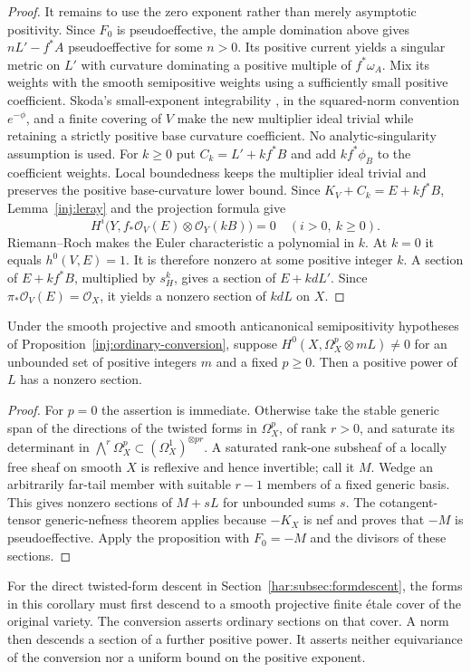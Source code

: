 \begin{proof}
It remains to use the zero exponent rather than merely asymptotic
positivity.  Since $F_0$ is pseudoeffective, the ample domination above
gives $nL'-f^*A$ pseudoeffective for some $n>0$.  Its positive current
yields a singular metric on $L'$ with curvature dominating a positive
multiple of $f^*\omega_A$.  Mix its weights with the smooth semipositive
weights using a sufficiently small positive coefficient.  Skoda's
small-exponent integrability \cite[Lemma~5.6(a)]{Demailly2011}, in
the squared-norm convention $e^{-\phi}$, and a finite covering of $V$ make the
new multiplier ideal trivial while retaining a strictly positive base
curvature coefficient.  No analytic-singularity assumption is used.
For $k\ge0$ put $C_k=L'+kf^*B$ and add $kf^*\phi_B$ to the coefficient
weights. Local boundedness keeps the multiplier ideal trivial and
preserves the positive base-curvature lower bound. Since
$K_V+C_k=E+kf^*B$, Lemma~\ref{inj:leray} and the projection formula give
\[
 H^i\bigl(Y,f_*\mathcal O_V(E)\otimes\mathcal O_Y(kB)\bigr)=0
 \quad(i>0,\ k\ge0).
\]
Riemann--Roch makes the Euler characteristic a polynomial in $k$.
At $k=0$ it equals $h^0(V,E)=1$.  It is therefore nonzero at some
positive integer $k$.  A section of $E+kf^*B$, multiplied by $s_H^k$,
gives a section of $E+kdL'$.  Since
$\pi_*\mathcal O_V(E)=\mathcal O_X$, it yields a nonzero section of
$kdL$ on $X$.
\end{proof}

\begin{corollary}\label{inj:forms-input}
Under the smooth projective and smooth anticanonical semipositivity
hypotheses of Proposition~\ref{inj:ordinary-conversion}, suppose
$H^0(X,\Omega_X^p\otimes mL)\ne0$ for an unbounded set of positive
integers $m$ and a fixed $p\ge0$.  Then a positive power of $L$ has
a nonzero section.
\end{corollary}
\begin{proof}
For $p=0$ the assertion is immediate.  Otherwise take the stable generic
span of the directions of the twisted forms in $\Omega_X^p$, of rank
$r>0$, and saturate its determinant in
$\bigwedge^r\Omega_X^p\subset(\Omega_X^1)^{\otimes pr}$.
A saturated rank-one subsheaf of a locally free sheaf on smooth $X$
is reflexive and hence invertible; call it $M$.  Wedge an arbitrarily
far-tail member with suitable $r-1$ members of a fixed generic basis.
This gives nonzero sections of $M+sL$ for unbounded sums $s$.
The cotangent-tensor generic-nefness theorem
\cite[Theorem 4.1]{LMPTX2023} applies because $-K_X$ is nef and
proves that $-M$ is pseudoeffective.  Apply the proposition with
$F_0=-M$ and the divisors of these sections.
\end{proof}

For the direct twisted-form descent in
Section~\ref{har:subsec:formdescent}, the forms in this
corollary must first descend to a smooth projective finite \'etale
cover of the original variety.  The conversion asserts ordinary
sections on that cover.  A norm then descends a section of a further
positive power.  It asserts neither equivariance of the conversion nor
a uniform bound on the positive exponent.
